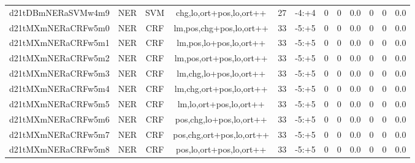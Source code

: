 \documentclass[a4paper]{article}
\begin{document}
\begin{landscape}
\begin{center}
\begin{tabular}{ |c|c|c|c|c|c|c|c|c|c|c|c|}
 
 	
 	\small{ d21tDBmNERaSVMw4m9 } & \small{ NER} & \small{  SVM }  & chg,lo,ort+pos,lo,ort++  &  27 &  \small{  -4:+4 }  &  0 & 0 & 0.0  &  0 & 0 & 0.0 \\
 	

 
 	
 	\small{ d21tMXmNERaCRFw5m0 } & \small{ NER} & \small{  CRF }  & lm,pos,chg+pos,lo,ort++  &  33 &  \small{  -5:+5 }  &  0 & 0 & 0.0  &  0 & 0 & 0.0 \\
 	

 
 	
 	\small{ d21tMXmNERaCRFw5m1 } & \small{ NER} & \small{  CRF }  & lm,pos,lo+pos,lo,ort++  &  33 &  \small{  -5:+5 }  &  0 & 0 & 0.0  &  0 & 0 & 0.0 \\
 	

 
 	
 	\small{ d21tMXmNERaCRFw5m2 } & \small{ NER} & \small{  CRF }  & lm,pos,ort+pos,lo,ort++  &  33 &  \small{  -5:+5 }  &  0 & 0 & 0.0  &  0 & 0 & 0.0 \\
 	

 
 	
 	\small{ d21tMXmNERaCRFw5m3 } & \small{ NER} & \small{  CRF }  & lm,chg,lo+pos,lo,ort++  &  33 &  \small{  -5:+5 }  &  0 & 0 & 0.0  &  0 & 0 & 0.0 \\
 	

 
 	
 	\small{ d21tMXmNERaCRFw5m4 } & \small{ NER} & \small{  CRF }  & lm,chg,ort+pos,lo,ort++  &  33 &  \small{  -5:+5 }  &  0 & 0 & 0.0  &  0 & 0 & 0.0 \\
 	

 
 	
 	\small{ d21tMXmNERaCRFw5m5 } & \small{ NER} & \small{  CRF }  & lm,lo,ort+pos,lo,ort++  &  33 &  \small{  -5:+5 }  &  0 & 0 & 0.0  &  0 & 0 & 0.0 \\
 	

 
 	
 	\small{ d21tMXmNERaCRFw5m6 } & \small{ NER} & \small{  CRF }  & pos,chg,lo+pos,lo,ort++  &  33 &  \small{  -5:+5 }  &  0 & 0 & 0.0  &  0 & 0 & 0.0 \\
 	

 
 	
 	\small{ d21tMXmNERaCRFw5m7 } & \small{ NER} & \small{  CRF }  & pos,chg,ort+pos,lo,ort++  &  33 &  \small{  -5:+5 }  &  0 & 0 & 0.0  &  0 & 0 & 0.0 \\
 	

 
 	
 	\small{ d21tMXmNERaCRFw5m8 } & \small{ NER} & \small{  CRF }  & pos,lo,ort+pos,lo,ort++  &  33 &  \small{  -5:+5 }  &  0 & 0 & 0.0  &  0 & 0 & 0.0 \\
 	


\end{tabular}
\end{center}
\end{landscape}
\end{document}
